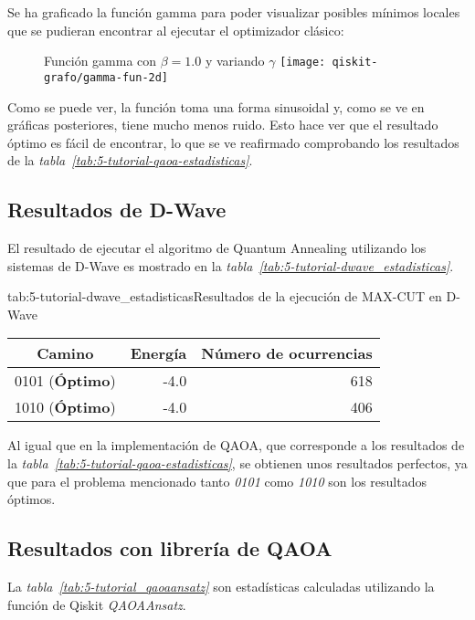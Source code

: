 Se ha graficado la función gamma para poder visualizar posibles mínimos locales que se pudieran encontrar al ejecutar el optimizador clásico:

\begin{figure}[htbp]{}{Función gamma con \(\beta = 1.0\) y variando \(\gamma\)}
  \texttt{[image: qiskit-grafo/gamma-fun-2d]}
\end{figure}

Como se puede ver, la función toma una forma sinusoidal y, como se ve en gráficas posteriores, tiene mucho menos ruido. Esto hace ver que el resultado óptimo es fácil de encontrar, lo que se ve reafirmado comprobando los resultados de la \textit{tabla~\ref{tab:5-tutorial-qaoa-estadisticas}}.

\subsection{Resultados de D-Wave}

El resultado de ejecutar el algoritmo de Quantum Annealing utilizando los sistemas de D-Wave es mostrado en la \textit{tabla~\ref{tab:5-tutorial-dwave_estadisticas}}.

\begin{table}[htbp]{tab:5-tutorial-dwave_estadisticas}{Resultados de la ejecución de MAX-CUT en D-Wave}
  \begin{tabular}{|c|r|r|}
    \hline
    \textbf{Camino}        & \textbf{Energía} & \textbf{Número de ocurrencias} \\ \hline
    0101 (\textbf{Óptimo}) & -4.0             & 618                            \\ \hline
    1010 (\textbf{Óptimo}) & -4.0             & 406                            \\ \hline
  \end{tabular}
\end{table}

Al igual que en la implementación de QAOA, que corresponde a los resultados de la \textit{tabla~\ref{tab:5-tutorial-qaoa-estadisticas}}, se obtienen unos resultados perfectos, ya que para el problema mencionado tanto \textit{0101} como \textit{1010} son los resultados óptimos.

\subsection{Resultados con librería de QAOA}

La \textit{tabla~\ref{tab:5-tutorial_qaoaansatz}} son estadísticas calculadas utilizando la función de Qiskit \textit{QAOAAnsatz}.

